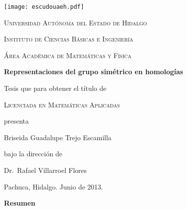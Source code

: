 \documentclass[12pt]{book}
\theoremstyle{definition}
\newcounter{in}
\newcommand{\elespacio}{1.4cm}
\begin{document}
\mainmatter 
\begin{titlepage}
  \begin{center}
    \null
    \vspace*{\fill}

    \texttt{[image: escudouaeh.pdf]}

    \vspace*{\elespacio}

    \textsc{Universidad Autónoma del Estado de Hidalgo}

    \textsc{Instituto de Ciencias Básicas e Ingeniería}

    \textsc{Área Académica de Matemáticas y Física}

    \vspace*{\elespacio}

    {\Huge\bfseries Representaciones del grupo simétrico en homologías\par}

    \vspace*{\elespacio}

    {\large Tesis que para obtener el título de}

    \vspace*{\elespacio}

    {\Large\textsc{Licenciada en Matemáticas Aplicadas}}

    \vspace*{\elespacio}

    {\large presenta}

    \vspace*{\elespacio}

    {\Huge Briseida Guadalupe Trejo Escamilla}

    \vspace*{\elespacio}

    {\large bajo la dirección de}

    \bigskip

    {\Large Dr.~Rafael Villarroel Flores}

    \bigskip

    {Pachuca, Hidalgo. Junio de 2013.}

    \vspace*{\fill}

  \end{center}
\end{titlepage}

\thispagestyle{empty}
\begin{flushleft}
  {\bfseries\Large Resumen}
\end{flushleft}
\end{document}
